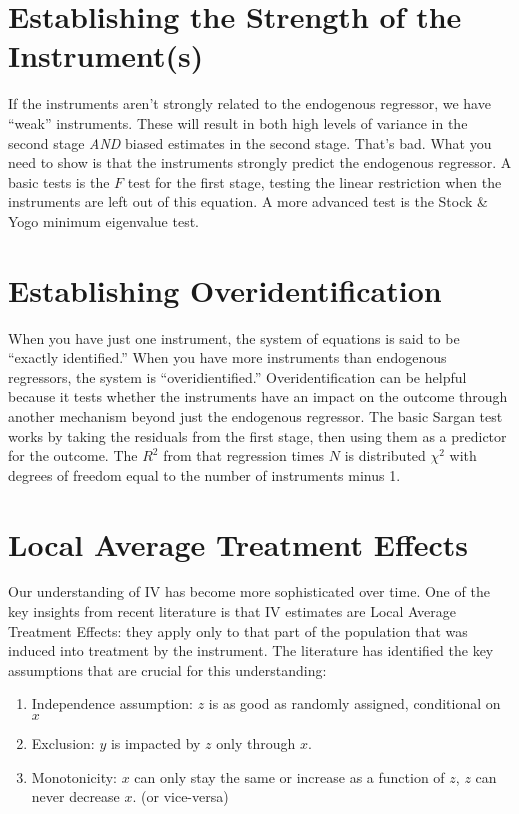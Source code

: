 \documentclass[12 pt]{article}
\begin{document}
\section{Establishing the Strength of the Instrument(s)}
\label{sec:establ-strength-inst}

If the instruments aren't strongly related to the endogenous
regressor, we have ``weak'' instruments. These will result in both
high levels of variance in the second stage \textit{AND} biased
estimates in the second stage. That's bad. What you need to show is
that the instruments strongly predict the endogenous regressor. A
basic tests is the $F$ test for the first stage, testing the linear
restriction when the instruments are left out of this equation. A
more advanced test is the Stock \& Yogo minimum eigenvalue test. 

\section{Establishing Overidentification}
\label{sec:establ-over}

When you have just one instrument, the system of equations is said to
be ``exactly identified.'' When you have more instruments than
endogenous regressors, the system is ``overidientified.''
Overidentification can be helpful because it tests whether the
instruments have an impact on the outcome through another mechanism
beyond just the endogenous regressor. The basic Sargan test works by
taking the residuals from the first stage, then using them as a
predictor for the outcome. The $R^2$ from that regression times $N$ is
distributed $\chi^2$ with degrees of freedom equal to the number of
instruments minus 1.

 

\section{Local Average Treatment Effects}
\label{sec:local-aver-treatm}

Our understanding of IV has become more sophisticated over time. One
of the key insights from recent literature is that IV estimates are
Local Average Treatment Effects: they apply only to that part of the
population that was induced into treatment by the instrument. The
literature has identified the key assumptions that are crucial for this
understanding:

\begin{enumerate}
\item Independence assumption: $z$ is as good as randomly assigned,
  conditional on $x$
\item Exclusion: $y$ is impacted by $z$ only through $x$.
\item Monotonicity: $x$ can only stay the same or increase as a
  function of $z$, $z$ can never decrease $x$. (or vice-versa)
\end{enumerate}
\end{document}

